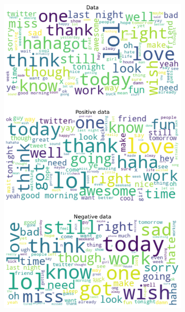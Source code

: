 \documentclass{article}
\begin{document}
\begin{itemize}
\begin{figure}[H]
\begin{subfigure}[b]{0.24\textwidth}
\includegraphics[width=\textwidth]{chapter-06/section-01-01/13/visualization/3/wordcloud.png}
\end{subfigure}
\begin{subfigure}[b]{0.24\textwidth}
\centering

\end{subfigure}
\end{figure}
\end{itemize}
\end{document}
